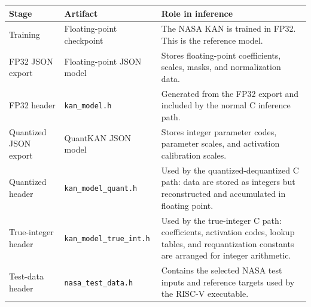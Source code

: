 \documentclass[11pt,a4paper]{article}
\begin{document}
\begin{center}
\begin{tabularx}{\textwidth}{@{}p{}p{}X@{}}
\toprule
Stage & Artifact & Role in inference \\
\midrule
Training & Floating-point checkpoint & The NASA KAN is trained in FP32. This is the reference model. \\
FP32 JSON export & Floating-point JSON model & Stores floating-point coefficients, scales, masks, and normalization data. \\
FP32 header & \texttt{kan\_model.h} & Generated from the FP32 export and included by the normal C inference path. \\
Quantized JSON export & QuantKAN JSON model & Stores integer parameter codes, parameter scales, and activation calibration scales. \\
Quantized header & \texttt{kan\_model\_quant.h} & Used by the quantized-dequantized C path: data are stored as integers but reconstructed and accumulated in floating point. \\
True-integer header & \texttt{kan\_model\_true\_int.h} & Used by the true-integer C path: coefficients, activation codes, lookup tables, and requantization constants are arranged for integer arithmetic. \\
Test-data header & \texttt{nasa\_test\_data.h} & Contains the selected NASA test inputs and reference targets used by the RISC-V executable. \\
\bottomrule
\end{tabularx}
\end{center}
\end{document}
